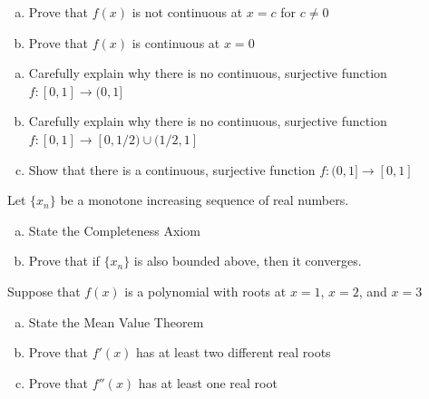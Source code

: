 \documentclass[11pt]{exam}
\theoremstyle{definition}
\begin{document}
\begin{questions}
\begin{enumerate}[(a)]
\item
Prove that $f(x)$ is not continuous at $x=c$ for $c\neq 0$
\vspace{3in}
\item
Prove that $f(x)$ is continuous at $x=0$
\end{enumerate}

\newpage
\question[10]\mbox{}

\begin{enumerate}[(a)]
\item
Carefully explain why there is no continuous, surjective function $f: [0,1]\rightarrow (0,1]$
\vspace{2.5in}
\item
Carefully explain why there is no continuous, surjective function $f: [0,1]\rightarrow [0,1/2)\cup (1/2,1]$
\vspace{2.5in}
\item
Show that there is a continuous, surjective function $f: (0,1]\rightarrow [0,1]$
\end{enumerate}


\newpage
\question[10]\mbox{}
Let $\{x_n\}$ be a monotone increasing sequence of real numbers.

\begin{enumerate}[(a)]
\item
State the Completeness Axiom
\vspace{2in}
\item
Prove that if $\{x_n\}$ is also bounded above, then it converges.
\end{enumerate}



\newpage
\question[10]\mbox{}
Suppose that $f(x)$ is a polynomial with roots at $x=1$, $x=2$, and $x=3$

\begin{enumerate}[(a)]
\item
State the Mean Value Theorem
\vspace{2in}
\item
Prove that $f'(x)$ has at least two different real roots
\vspace{3.5in}
\item
Prove that $f''(x)$ has at least one real root
\end{enumerate}


\end{questions}
\end{document}
